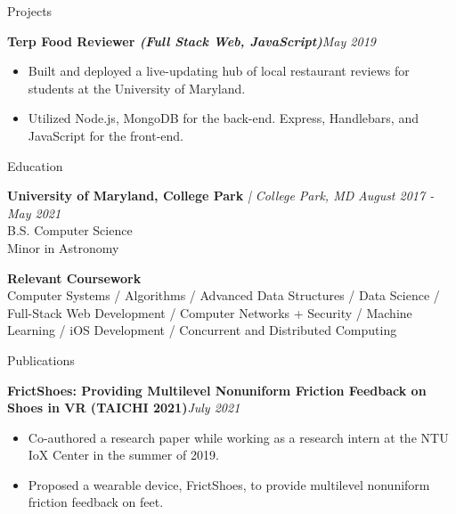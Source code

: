 \documentclass{resume} %
\begin{document}
\begin{rSection}{Projects}
\begin{rSubsection}{\bf Terp Food Reviewer \hspace{0.1em} \it (Full Stack Web, JavaScript)}{\em May 2019}{}{}
\begin{itemize}
    \item Built and deployed a live-updating hub of local restaurant reviews for students at the University of Maryland.\vspace{-0.6em}
    \item Utilized Node.js, MongoDB for the back-end. Express, Handlebars, and JavaScript for the front-end.
\end{itemize}
\end{rSubsection}


\end{rSection}




\begin{rSection}{Education}

{\bf University of Maryland, College Park} {\em | College Park, MD} \hfill {\em August 2017 - May 2021}
\\ B.S. Computer Science
\\ Minor in Astronomy

{\bf Relevant Coursework}
\\ Computer Systems / Algorithms / Advanced Data Structures / Data Science / Full-Stack Web Development / Computer Networks + Security / Machine Learning / iOS Development / Concurrent and Distributed Computing



\end{rSection}



\begin{rSection}{Publications} \itemsep -3pt
\begin{rSubsection}{\bf FrictShoes: Providing Multilevel Nonuniform Friction Feedback on Shoes in VR (TAICHI 2021)}{\em July 2021}{}{}
\begin{itemize}
    \item Co-authored a research paper while working as a research intern at the NTU IoX Center in the summer of 2019.\vspace{-0.6em}
    \item Proposed a wearable device, FrictShoes, to provide multilevel nonuniform friction feedback on feet.
\end{itemize}
\end{rSubsection}
\end{rSection}
\end{document}
